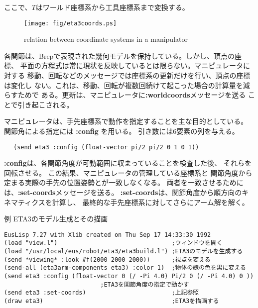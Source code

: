 ここで、$T$はワールド座標系から工具座標系まで変換する。

\begin{figure}
\begin{center}
\texttt{[image: fig/eta3coords.ps]}
\end{center}
\caption{\label{JointCoords}
relation between coordinate systems in a manipulator}

\end{figure}


各関節は、Brepで表現された幾何モデルを保持している。しかし、頂点の座標、
平面の方程式は常に現状を反映しているとは限らない。マニピュレータに対する
移動、回転などのメッセージでは座標系の更新だけを行い、頂点の座標は変化し
ない。これは、移動、回転が複数回続けて起こった場合の計算量を減らすためで
ある。更新は、マニピュレータに{\bf :worldcoords}メッセージを送る
ことで引き起こされる。


マニピュレータは、手先座標系で動作を指定することを主な目的としている。
関節角による指定には {\bf :config} を用いる。
引き数には6要素の列を与える。

\begin{verbatim}
　 (send eta3 :config (float-vector pi/2 pi/2 0 1 0 1))
\end{verbatim}

{\bf :config}は、各関節角度が可動範囲に収まっていることを検査した後、
それらを回転させる。
この結果、マニピュレータの管理している座標系と
関節角度から定まる実際の手先の位置姿勢とが一致しなくなる。
両者を一致させるためには、{\bf :set-coords}メッセージを送る。
{\bf :set-coords}は、関節角度から順方向のキネマティクスを計算し、
最終的な手先座標系に対してさらにアーム解を解く。


例 ETA3のモデル生成とその描画
\begin{verbatim}
EusLisp 7.27 with Xlib created on Thu Sep 17 14:33:30 1992
(load "view.l")                                ;ウィンドウを開く
(load "/usr/local/eus/robot/eta3/eta3build.l") ;ETA3のモデルを生成する
(send *viewing* :look #f(2000 2000 2000))      ;視点を変える
(send-all (eta3arm-components eta3) :color 1)  ;物体の線の色を黒に変える
(send eta3 :config (float-vector 0 (/ -Pi 4.0) Pi/2 0 (/ -Pi 4.0) 0 ))
					       ;ETA3を関節角度の指定で動かす
(send eta3 :set-coords)                        ;上記参照
(draw eta3)                                    ;ETA3を描画する
\end{verbatim}

\newpage
